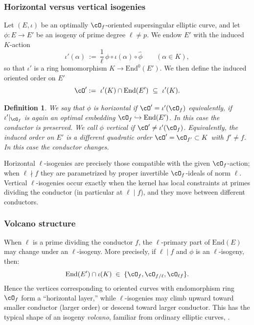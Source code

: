 \documentclass[10pt]{amsart}
\theoremstyle{theostyle}
\newtheorem{definition}[theorem]{Definition}
\newcommand{\End}{\mathrm{End}}
\begin{document}
\subsubsection*{Horizontal versus vertical isogenies}

Let $(E,\iota)$ be an optimally $\cO_f$-oriented supersingular elliptic curve, and 
let $\phi:E\to E'$ be an isogeny of prime degree $\ell\neq p$. We endow $E'$ with the induced
$K$-action
\[
\iota'(\alpha)\ :=\ \frac{1}{\ell}\,\phi\circ \iota(\alpha)\circ \widehat{\phi}
\qquad(\alpha\in K),
\]
so that $\iota'$ is a ring homomorphism $K\to \End^0(E')$.
We then define the induced oriented order on $E'$ 
\[
\cO' :=\ \iota'(K)\cap \End(E')\ \subseteq\ \iota'(K).
\]
\begin{definition}
We say that $\phi$ is \emph{horizontal} if $\cO'=\iota'(\cO_f)$
equivalently, if $\iota'|_{\cO_f}$ is again an \emph{optimal} embedding
$\cO_f\hookrightarrow \End(E')$.  In this case the conductor is preserved.
We call $\phi$ \emph{vertical} if $\cO'\neq \iota'(\cO_f)$.
Equivalently, the induced order on $E'$ is a different quadratic order
$\cO'=\cO_{f'}\subset K$ with $f'\neq f$.
In this case the conductor changes. 
\end{definition}

Horizontal $\ell$-isogenies are precisely those compatible with the given
$\cO_f$-action; when $\ell\nmid f$ they are parametrized by proper invertible
$\cO_f$-ideals of norm $\ell$.  Vertical $\ell$-isogenies occur exactly when the
kernel has local constraints at primes dividing the conductor (in particular
at $\ell\mid f$), and they move between different conductors.

\subsubsection*{Volcano structure}

When $\ell$ is a prime dividing the conductor $f$, the $\ell$-primary part of
$\End(E)$ may change under an $\ell$-isogeny.  More precisely, if 
$\ell\mid f$ and $\phi$ is an $\ell$-isogeny, then:
\[
\End(E')\cap\iota(K) \;\in\; \{\cO_f,\cO_{f/\ell},\cO_{\ell f}\}.
\]
Hence the vertices corresponding to oriented curves with endomorphism ring
$\cO_f$ form a ``horizontal layer,'' while $\ell$-isogenies may climb upward
toward smaller conductor (larger order) or descend toward larger conductor.
This has the typical shape of an isogeny \emph{volcano}, familiar from
ordinary elliptic curves, \cite{Kohel1996,Sutherland:Volcano}.
\end{document}
